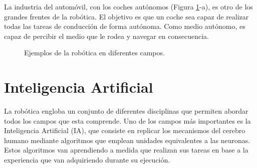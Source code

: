 La industria del automóvil, con los coches autónomos (Figura \ref{fig:coches}-a), es otro de los grandes frentes de la robótica. El objetivo es que un coche sea capaz de realizar todas las tareas de conducción de forma autónoma. Como medio autónomo, es capaz de percibir el medio que le rodea y navegar en consecuencia.
\begin{figure}[h!]
  \begin{center}
  \end{center}
\caption{Ejemplos de la robótica en diferentes campos.} \label{fig:coches}
\end{figure}

\section{Inteligencia Artificial}
La robótica engloba un conjunto de diferentes disciplinas que permiten abordar todos los campos que esta comprende. Uno de los campos más importantes es la Inteligencia Artificial (IA), que consiste en replicar los mecanismos del cerebro humano mediante algoritmos que emplean unidades equivalentes a las neuronas. Estos algoritmos van aprendiendo a medida que realizan sus tareas en base a la experiencia que van adquiriendo durante su ejecución.\\

